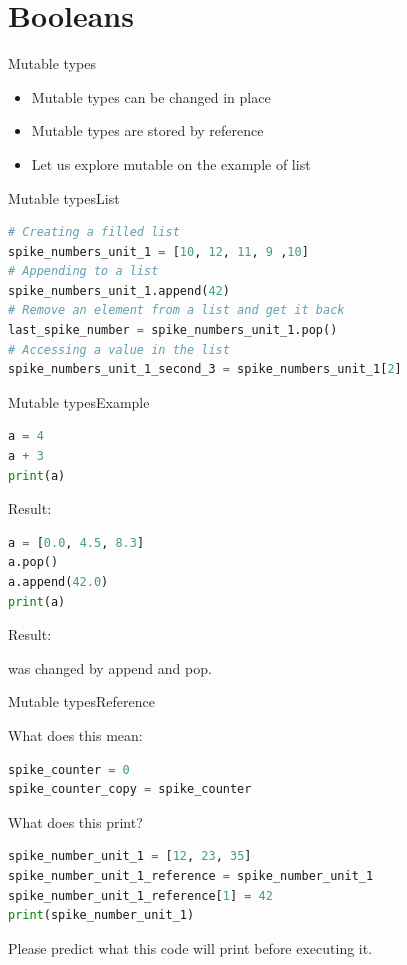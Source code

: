 \documentclass[aspectratio=169]{beamer}
\begin{document}
\section{Booleans}
\begin{frame}{Mutable types}
\begin{itemize}
	\item Mutable types can be changed in place
	\item Mutable types are stored by reference
	\item Let us explore mutable on the example of list
\end{itemize}
\end{frame}

\begin{frame}[fragile]{Mutable types}{List}
\begin{lstlisting}[language=Python, frame=single]
# Creating a filled list
spike_numbers_unit_1 = [10, 12, 11, 9 ,10]
# Appending to a list
spike_numbers_unit_1.append(42)
# Remove an element from a list and get it back
last_spike_number = spike_numbers_unit_1.pop()
# Accessing a value in the list
spike_numbers_unit_1_second_3 = spike_numbers_unit_1[2]
\end{lstlisting}
\end{frame}

\begin{frame}[fragile]{Mutable types}{Example}
\begin{lstlisting}[language=Python, frame=single]
a = 4
a + 3
print(a)
\end{lstlisting}

Result: \pause {}

\pause

\begin{lstlisting}[language=Python, frame=single]
a = [0.0, 4.5, 8.3]
a.pop()
a.append(42.0)
print(a)
\end{lstlisting}

Result: \pause \textquote{[0.0, 4.5, 8.3]}

\pause
{} was changed by append and pop.

\end{frame}

\begin{frame}[fragile]{Mutable types}{Reference}

What does this mean:
\begin{lstlisting}[language=Python, frame=single]
spike_counter = 0
spike_counter_copy = spike_counter
\end{lstlisting}

\pause

What does this print?

\begin{lstlisting}[language=Python, frame=single]
spike_number_unit_1 = [12, 23, 35]
spike_number_unit_1_reference = spike_number_unit_1
spike_number_unit_1_reference[1] = 42
print(spike_number_unit_1)
\end{lstlisting}

Please predict what this code will print before executing it.

\end{frame}
\end{document}
